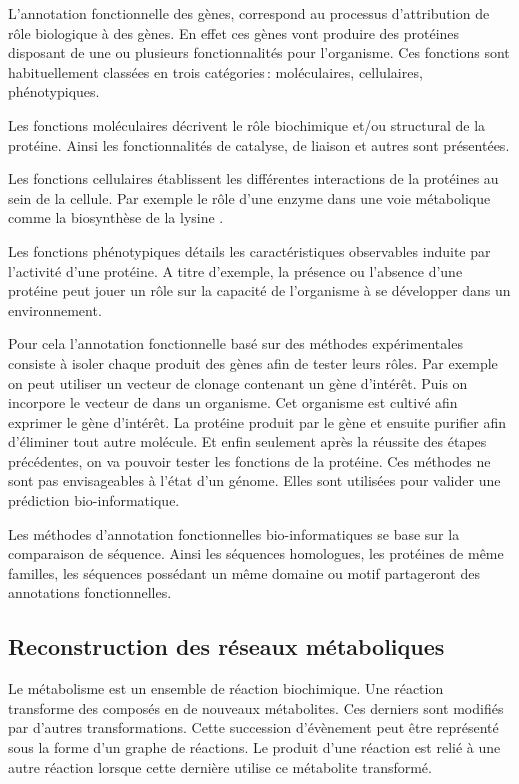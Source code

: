 \begin{refsegment}
    L’annotation fonctionnelle des gènes, correspond au processus d’attribution de rôle biologique à des gènes. En effet ces gènes vont produire des protéines disposant de une ou plusieurs fonctionnalités pour l’organisme. Ces fonctions sont habituellement classées en trois catégories : moléculaires, cellulaires, phénotypiques.
    
    Les fonctions moléculaires décrivent le rôle biochimique et/ou structural de la protéine. Ainsi les fonctionnalités de catalyse, de liaison et autres sont présentées.
    
    Les fonctions cellulaires établissent les différentes interactions de la protéines au sein de la cellule. Par exemple le rôle d’une enzyme dans une voie métabolique comme la biosynthèse de la lysine . 
    
    Les fonctions phénotypiques détails les caractéristiques observables induite par l’activité d’une protéine. A titre d’exemple, la présence ou l’absence d’une protéine peut jouer un rôle sur la capacité de l’organisme à se développer dans un environnement.
    
    Pour cela l’annotation fonctionnelle basé sur des méthodes expérimentales consiste à isoler chaque produit des gènes afin de tester leurs rôles. Par exemple on peut utiliser un vecteur de clonage contenant un gène d'intérêt. Puis on incorpore le vecteur de dans un organisme. Cet organisme est cultivé afin exprimer le gène d'intérêt. La protéine produit par le gène et ensuite purifier afin d'éliminer tout autre molécule. Et enfin seulement après la réussite des étapes précédentes, on va pouvoir tester les fonctions de la protéine.  Ces méthodes ne sont  pas envisageables à l’état d’un génome. Elles sont utilisées pour valider une prédiction bio-informatique.
    
    Les méthodes d’annotation fonctionnelles  bio-informatiques se base sur la comparaison de séquence. Ainsi les séquences homologues, les protéines de même familles, les séquences possédant un même domaine ou motif partageront des annotations fonctionnelles.
    
    \subsection{Reconstruction des réseaux métaboliques}
    Le métabolisme est un ensemble de réaction biochimique. Une réaction transforme des composés en de nouveaux métabolites. Ces derniers sont modifiés par d'autres transformations. Cette succession d'évènement peut être représenté sous la forme d’un graphe de réactions. Le produit d’une réaction est relié à une autre réaction lorsque cette dernière utilise ce métabolite transformé.
    

\end{refsegment}
